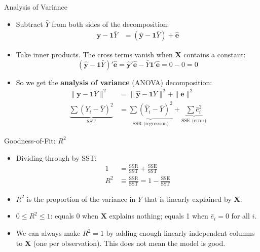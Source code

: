 \documentclass[aspectratio=169, handout]{beamer}
\numberwithin{equation}{section}
\begin{document}
\begin{frame}{Analysis of Variance}
\begin{itemize}
\item Subtract $\bar{Y}$ from both sides of the decomposition:
\begin{align*}
\bm{y}-\bm{1}\bar{Y}&=(\bm{\hat{y}}-\bm{1}\bar{Y})+\bm{\hat{e}}
\end{align*}
\item Take inner products. The cross terms vanish when $\bm{X}$ contains a constant:
$$(\bm{\hat{y}}-\bm{1}\bar{Y})'\bm{\hat{e}}=\bm{\hat{y}}'\bm{\hat{e}}-\bar{Y}\bm{1}'\bm{\hat{e}}=0-0=0$$
\item So we get the \textbf{analysis of variance} (ANOVA) decomposition:
\begin{align*}
\|\bm{y}-\bm{1}\bar{Y}\|^2&=\|\bm{\hat{y}}-\bm{1}\bar{Y}\|^2+\|\bm{\hat{e}}\|^2\\
\underbrace{\textstyle\sum (Y_i-\bar{Y})^2}_{\text{SST}}&=\underbrace{\textstyle\sum (\hat{Y}_i-\bar{Y})^2}_{\text{SSR (regression)}}+\underbrace{\textstyle\sum \hat{e}_i^2}_{\text{SSE (error)}}
\end{align*}
\end{itemize}
\end{frame}

\begin{frame}{Goodness-of-Fit: $R^2$}
\begin{itemize}
\item Dividing through by SST:
\begin{align*}
1 &= \frac{\text{SSR}}{\text{SST}}+ \frac{\text{SSE}}{\text{SST}}\\
R^2&\equiv \frac{\text{SSR}}{\text{SST}}= 1-\frac{\text{SSE}}{\text{SST}}
\end{align*}
\item $R^2$ is the proportion of the variance in $Y$ that is linearly explained by $\bm{X}$.
\item $0\leq R^2\leq 1$: equals 0 when $\bm{X}$ explains nothing; equals 1 when $\hat{e}_i=0$ for all $i$.
\item We can always make $R^2=1$ by adding enough linearly independent columns to $\bm{X}$ (one per observation). This does not mean the model is good.
\end{itemize}
\end{frame}
\end{document}
